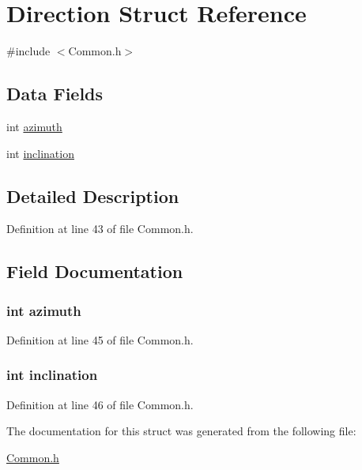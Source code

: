 \hypertarget{struct_direction}{\section{Direction Struct Reference}
\label{struct_direction}
}


{\ttfamily \#include $<$Common.\+h$>$}

\subsection*{Data Fields}
\begin{DoxyCompactItemize}
\item 
int \hyperlink{struct_direction_a866e78e12cb32dcaf1ded89bda8be8f5}{azimuth}
\item 
int \hyperlink{struct_direction_af308b9934394c8bcf7614eb1df2d863f}{inclination}
\end{DoxyCompactItemize}


\subsection{Detailed Description}


Definition at line 43 of file Common.\+h.



\subsection{Field Documentation}
\hypertarget{struct_direction_a866e78e12cb32dcaf1ded89bda8be8f5}{
\subsubsection[{azimuth}]{\setlength{\rightskip}{0pt plus 5cm}int azimuth}}\label{struct_direction_a866e78e12cb32dcaf1ded89bda8be8f5}


Definition at line 45 of file Common.\+h.

\hypertarget{struct_direction_af308b9934394c8bcf7614eb1df2d863f}{
\subsubsection[{inclination}]{\setlength{\rightskip}{0pt plus 5cm}int inclination}}\label{struct_direction_af308b9934394c8bcf7614eb1df2d863f}


Definition at line 46 of file Common.\+h.



The documentation for this struct was generated from the following file\+:\begin{DoxyCompactItemize}
\item 
\hyperlink{_common_8h}{Common.\+h}\end{DoxyCompactItemize}
